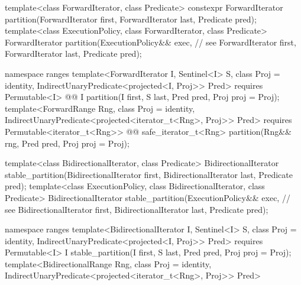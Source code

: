 \begin{codeblock}
  template<class ForwardIterator, class Predicate>
    constexpr ForwardIterator partition(ForwardIterator first,
                                        ForwardIterator last,
                                        Predicate pred);
  template<class ExecutionPolicy, class ForwardIterator, class Predicate>
    ForwardIterator partition(ExecutionPolicy&& exec, // see 
                              ForwardIterator first,
                              ForwardIterator last,
                              Predicate pred);
\end{codeblock}\begin{addedblock}\begin{codeblock}
  namespace ranges {
    template<ForwardIterator I, Sentinel<I> S, class Proj = identity,
        IndirectUnaryPredicate<projected<I, Proj>> Pred>
      requires Permutable<I>
      @@ I
        partition(I first, S last, Pred pred, Proj proj = Proj{});
    template<ForwardRange Rng, class Proj = identity,
        IndirectUnaryPredicate<projected<iterator_t<Rng>, Proj>> Pred>
      requires Permutable<iterator_t<Rng>>
      @@ safe_iterator_t<Rng>
        partition(Rng&& rng, Pred pred, Proj proj = Proj{});
  }
\end{codeblock}\end{addedblock}\begin{codeblock}
  template<class BidirectionalIterator, class Predicate>
    BidirectionalIterator stable_partition(BidirectionalIterator first,
                                           BidirectionalIterator last,
                                           Predicate pred);
  template<class ExecutionPolicy, class BidirectionalIterator, class Predicate>
    BidirectionalIterator stable_partition(ExecutionPolicy&& exec, // see 
                                           BidirectionalIterator first,
                                           BidirectionalIterator last,
                                           Predicate pred);
\end{codeblock}\begin{addedblock}\begin{codeblock}
  namespace ranges {
    template<BidirectionalIterator I, Sentinel<I> S, class Proj = identity,
        IndirectUnaryPredicate<projected<I, Proj>> Pred>
      requires Permutable<I>
      I stable_partition(I first, S last, Pred pred, Proj proj = Proj{});
    template<BidirectionalRange Rng, class Proj = identity,
        IndirectUnaryPredicate<projected<iterator_t<Rng>, Proj>> Pred>
}
\end{codeblock}
\end{addedblock}
